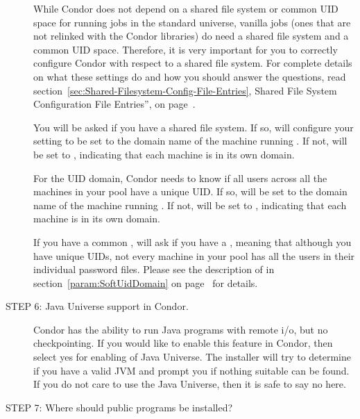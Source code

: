\begin{description}
     While Condor does not depend on a shared file system or common UID
     space for running jobs in the standard universe,
     vanilla jobs (ones that are not relinked with the Condor
     libraries) do need a shared file system and a common UID space.  
     Therefore, it is very important for you to correctly configure
     Condor with respect to a shared file system.
     For complete details on what these settings do and how you
     should answer the questions, read
     section~\ref{sec:Shared-Filesystem-Config-File-Entries},
     Shared File System Configuration File Entries'', on
     page~\pageref{sec:Shared-Filesystem-Config-File-Entries}.

     You will be asked if you have a shared file system.  If so,
      will configure your  
     setting to be set to the domain name of the machine running
     .
     If not,  will be set to
     , indicating that each machine is in its
     own domain.

     For the UID domain, Condor needs to know if all users across all
     the machines in your pool have a unique UID.  
     If so,  will be set to the domain name of the
     machine running . 
     If not,  will be set to
     , indicating that each machine is in its 
     own domain.

     If you have a common ,  will
     ask if you have a , meaning that although
     you have unique UIDs, not every machine in your pool has all the
     users in their individual password files.  Please see the
     description of  in
     section~\ref{param:SoftUidDomain} on
     page~\pageref{param:SoftUidDomain} for details.  

\item[STEP 6: Java Universe support in Condor.]

	Condor has the ability to run Java programs with remote i/o,
	but no checkpointing. If you would like to enable this feature
	in Condor, then select yes for enabling of Java Universe. The
	installer will try to determine if you have a valid JVM and
	prompt you if nothing suitable can be found. If you do not care
	to use the Java Universe, then it is safe to say no here.

\item[STEP 7: Where should public programs be installed?]


\end{description}
